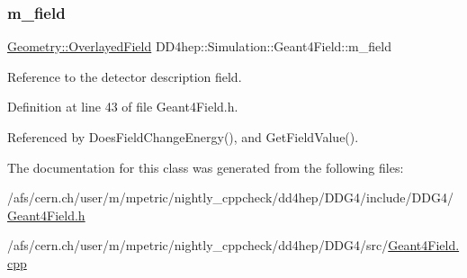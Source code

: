 \subsubsection{\texorpdfstring{m\+\_\+field}{m\_field}}
{\footnotesize\ttfamily \hyperlink{class_d_d4hep_1_1_geometry_1_1_overlayed_field}{Geometry\+::\+Overlayed\+Field} D\+D4hep\+::\+Simulation\+::\+Geant4\+Field\+::m\+\_\+field\hspace{0.3cm}{\ttfamily [protected]}}



Reference to the detector description field. 



Definition at line 43 of file Geant4\+Field.\+h.



Referenced by Does\+Field\+Change\+Energy(), and Get\+Field\+Value().



The documentation for this class was generated from the following files\+:\begin{DoxyCompactItemize}
\item 
/afs/cern.\+ch/user/m/mpetric/nightly\+\_\+cppcheck/dd4hep/\+D\+D\+G4/include/\+D\+D\+G4/\hyperlink{_geant4_field_8h}{Geant4\+Field.\+h}\item 
/afs/cern.\+ch/user/m/mpetric/nightly\+\_\+cppcheck/dd4hep/\+D\+D\+G4/src/\hyperlink{_geant4_field_8cpp}{Geant4\+Field.\+cpp}\end{DoxyCompactItemize}
